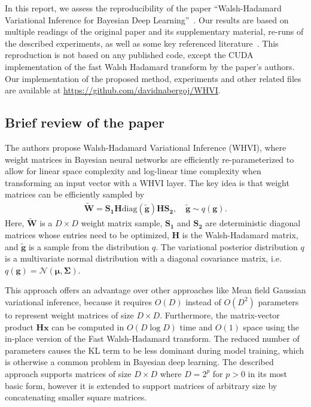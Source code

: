 In this report, we assess the reproducibility of the paper ``Walsh-Hadamard Variational Inference for Bayesian Deep Learning''~\cite{rossi2019walsh}.
Our results are based on multiple readings of the original paper and its supplementary material, re-runs of the described experiments, as well as some key referenced literature~\cite{le2014fastfood, blundell2015weight, fino1976unified, kingma2015variational, rossi2019good}.
This reproduction is not based on any published code, except the CUDA implementation of the fast Walsh Hadamard transform by the paper's authors.
Our implementation of the proposed method, experiments and other related files are available at \url{https://github.com/davidnabergoj/WHVI}.

\subsection{Brief review of the paper}\label{subsec:brief-review-of-the-paper}
The authors propose Walsh-Hadamard Variational Inference (WHVI), where weight matrices in Bayesian neural networks are efficiently re-parameterized to allow for linear space complexity and log-linear time complexity when transforming an input vector with a WHVI layer.
The key idea is that weight matrices can be efficiently sampled by
\begin{align}
    \widetilde{\mathbf{W}} = \mathbf{S_1} \mathbf{H} \mathrm{diag}(\widetilde{\mathbf{g}}) \mathbf{H} \mathbf{S_2},\quad\widetilde{\mathbf{g}} \sim q(\mathbf{g}).
    \label{eqn:weight-sampling}
\end{align}
Here, $\widetilde{\mathbf{W}}$ is a $D \times D$ weight matrix sample, $\mathbf{S_1}$ and $\mathbf{S_2}$ are deterministic diagonal matrices whose entries need to be optimized, $\mathbf{H}$ is the Walsh-Hadamard matrix, and $\widetilde{\mathbf{g}}$ is a sample from the distribution $q$.
The variational posterior distribution $q$ is a multivariate normal distribution with a diagonal covariance matrix, i.e.\ $q(\mathbf{g}) = \mathcal{N}(\mathbf{\mu}, \mathbf{\Sigma})$.

This approach offers an advantage over other approaches like Mean field Gaussian variational inference, because it requires $O(D)$ instead of $O(D^2)$ parameters to represent weight matrices of size $D \times D$.
Furthermore, the matrix-vector product $\mathbf{Hx}$ can be computed in $O(D \log D)$ time and $O(1)$ space using the in-place version of the Fast Walsh-Hadamard transform.
The reduced number of parameters causes the KL term to be less dominant during model training, which is otherwise a common problem in Bayesian deep learning.
The described approach supports matrices of size $D \times D$ where $D = 2^p$ for $p > 0$ in its most basic form, however it is extended to support matrices of arbitrary size by concatenating smaller square matrices.

